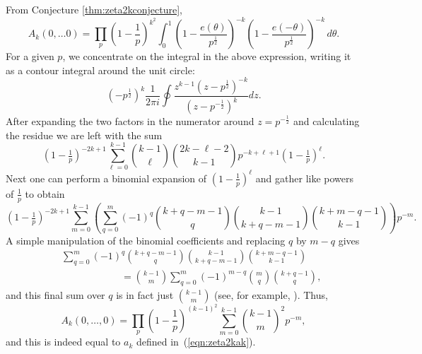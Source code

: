 \documentclass[12pt,letterpaper]{amsart}
\theoremstyle{plain}
\theoremstyle{definition}
\theoremstyle{remark}
\numberwithin{equation}{subsection}
\numberwithin{theorem}{subsection}
\numberwithin{table}{subsection}
\begin{document}
From Conjecture \ref{thm:zeta2kconjecture},
\begin{equation}
A_k(0,\ldots0)=\prod_p \left(1-\frac{1}{p}\right)^{k^2}\int_0^1
\left(1-\frac{e(\theta)}{p^{\frac12 }}\right)^{-k}
\left(1-\frac{e(-\theta)}{p^{\frac12 }}\right)^{-k}\,d\theta.
\end{equation}
For a given $p$, we concentrate on the integral in the above
expression, writing it as a contour integral around the unit
circle:
\begin{equation}
(-p^{\frac12 })^k \frac{1}{2\pi i} \oint \frac{z^{k-1}(z-p^{\frac12 })^{-k}}
{(z-p^{-\frac12 })^k} dz.
\end{equation}
  After expanding the two factors in the numerator around
$z=p^{-\frac12 }$ and calculating the residue we are left with the sum
\begin{equation}
(1-\tfrac{1}{p})^{-2k+1}\sum_{\ell=0}^{k-1}\binom{k-1}{\ell}
\binom{2k-\ell-2}{k-1} p^{-k+\ell+1}(1-\tfrac{1}{p})^{\ell}.
\end{equation}
Next one can perform a binomial expansion of
$(1-\frac{1}{p})^{\ell}$ and gather like powers of $\frac{1}{p}$
to obtain
\begin{equation}
(1-\tfrac{1}{p})^{-2k+1}\sum_{m=0}^{k-1}\left(\sum_{q=0}^m (-1)^q
\binom{k+q-m-1}{q}\binom{k-1}{k+q-m-1}\binom{k+m-q-1}{k-1} \right)
p^{-m}.
\end{equation}
A simple manipulation of the binomial coefficients and replacing
$q$ by $m-q$ gives
\begin{eqnarray}
&&\sum_{q=0}^m(-1)^q\binom{k+q-m-1}{q}\binom{k-1}{k+q-m-1}\binom{k+m-q-1}{k-1}\nonumber
\\
&&\qquad\qquad\qquad =\binom{k-1}{m}\sum_{q=0}^m
(-1)^{m-q}\binom{m}{q}\binom{k+q-1}{q},
\end{eqnarray}
and this final sum over $q$ is in fact just $\binom{k-1}{m}$ (see,
for example, \cite{Rio}).  Thus,
\begin{equation}
A_k(0,\ldots,0)=\prod_p \left(1-\frac{1}{p}\right)^{(k-1)^2}
\sum_{m=0}^{k-1}\binom{k-1}{m}^2 p^{-m} ,
\end{equation}
and this is indeed equal to $a_k$ defined in~(\ref{eqn:zeta2kak}).
\end{document}
